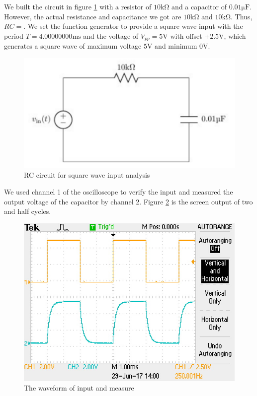 \hfill \newline
\phantom{ } We built the circuit in figure \ref{fig:cir} with a resistor of $10\mathrm{k\Omega}$ and a capacitor of
$0.01\mathrm{\mu F}$. However, the actual resistance and capacitance we got are $10\mathrm{k\Omega}$ and $10\mathrm{k\Omega}$. Thus, $RC=$. \newline
\phantom{ } We set the function generator to provide a square wave input with the period $T=4.00000000\mathrm{ms}$ and the voltage of $V_{pp}=5\mathrm{V}$ with offset $+2.5\mathrm{V}$, which generates a square wave of maximum voltage $5\mathrm{V}$ and minimum $0\mathrm{V}$.

\begin{figure}[!htbp]
	\centering
	\includegraphics[width=\linewidth]{images/1_1.PNG}
	\caption{RC circuit for square wave input analysis}
	\label{fig:cir}
\end{figure}

We used channel 1 of the oscilloscope to verify the input and measured the output voltage of the capacitor by channel 2. Figure \ref{fig:osc1} is the screen output of two and half cycles.

\begin{figure}[!htbp]
	\centering
	\includegraphics[width=0.95\linewidth]{images/1_2.JPG}
	\caption{The waveform of input and measure}
	\label{fig:osc1}
\end{figure}

